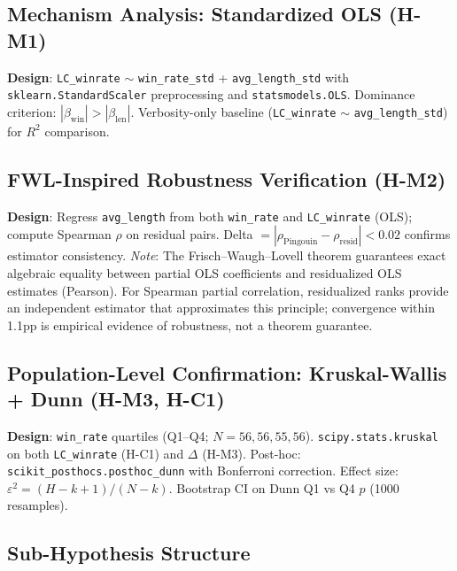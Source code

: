 \subsection{Mechanism Analysis: Standardized OLS (H-M1)}

\textbf{Design}: \texttt{LC\_winrate} $\sim$ \texttt{win\_rate\_std} + \texttt{avg\_length\_std}
with \texttt{sklearn.StandardScaler} preprocessing and \texttt{statsmodels.OLS}. Dominance
criterion: $|\beta_{\mathrm{win}}| > |\beta_{\mathrm{len}}|$. Verbosity-only baseline
(\texttt{LC\_winrate} $\sim$ \texttt{avg\_length\_std}) for $R^2$ comparison.

\subsection{FWL-Inspired Robustness Verification (H-M2)}

\textbf{Design}: Regress \texttt{avg\_length} from both \texttt{win\_rate} and
\texttt{LC\_winrate} (OLS); compute Spearman $\rho$ on residual pairs. Delta
$= |\rho_{\mathrm{Pingouin}} - \rho_{\mathrm{resid}}| < 0.02$ confirms estimator consistency.
\textit{Note}: The Frisch--Waugh--Lovell theorem guarantees exact algebraic equality between
partial OLS coefficients and residualized OLS estimates (Pearson). For Spearman partial
correlation, residualized ranks provide an independent estimator that approximates this
principle; convergence within 1.1pp is empirical evidence of robustness, not a theorem
guarantee.

\subsection{Population-Level Confirmation: Kruskal-Wallis + Dunn (H-M3, H-C1)}

\textbf{Design}: \texttt{win\_rate} quartiles (Q1--Q4; $N = 56, 56, 55, 56$).
\texttt{scipy.stats.kruskal} on both \texttt{LC\_winrate} (H-C1) and $\Delta$ (H-M3).
Post-hoc: \texttt{scikit\_posthocs.posthoc\_dunn} with Bonferroni correction. Effect size:
$\varepsilon^2 = (H - k + 1) / (N - k)$. Bootstrap CI on Dunn Q1 vs Q4 $p$ (1000 resamples).

\subsection{Sub-Hypothesis Structure}

